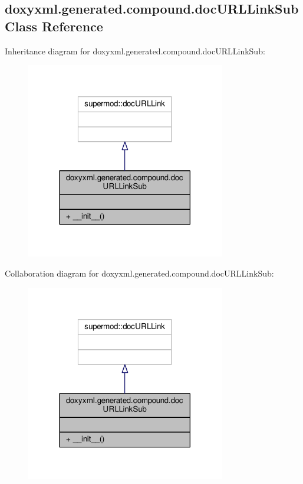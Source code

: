 \subsection{doxyxml.\+generated.\+compound.\+doc\+U\+R\+L\+Link\+Sub Class Reference}
\label{classdoxyxml_1_1generated_1_1compound_1_1docURLLinkSub}


Inheritance diagram for doxyxml.\+generated.\+compound.\+doc\+U\+R\+L\+Link\+Sub\+:
\nopagebreak
\begin{figure}[H]
\begin{center}
\leavevmode
\includegraphics[width=246pt]{d4/dab/classdoxyxml_1_1generated_1_1compound_1_1docURLLinkSub__inherit__graph}
\end{center}
\end{figure}


Collaboration diagram for doxyxml.\+generated.\+compound.\+doc\+U\+R\+L\+Link\+Sub\+:
\nopagebreak
\begin{figure}[H]
\begin{center}
\leavevmode
\includegraphics[width=246pt]{de/db8/classdoxyxml_1_1generated_1_1compound_1_1docURLLinkSub__coll__graph}
\end{center}
\end{figure}
